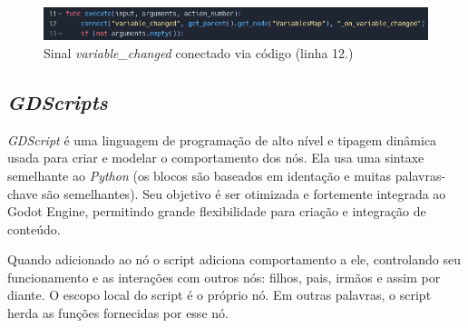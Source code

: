 \begin{figure}[H]
      \includegraphics[width=\textwidth]{../figuras/sinal_conectado_codigo.png}
      \caption{Sinal \textit{variable\_changed} conectado via código (linha 12.)}
\end{figure}

\subsection{\textit{GDScripts}}

\textit{GDScript} é uma linguagem de programação de alto nível e tipagem 
dinâmica usada para criar e modelar o comportamento dos nós.
Ela usa uma sintaxe semelhante ao \textit{Python} (os blocos são 
baseados em identação e muitas palavras-chave são semelhantes). 
Seu objetivo é ser otimizada e fortemente integrada ao Godot Engine, permitindo
grande flexibilidade para criação e integração de conteúdo.

Quando adicionado ao nó o script adiciona comportamento a ele, controlando seu
funcionamento e as interações com outros nós: filhos, pais, irmãos e assim por 
diante. O escopo local do script é o próprio nó. Em outras palavras, o script 
herda as funções fornecidas por esse nó.